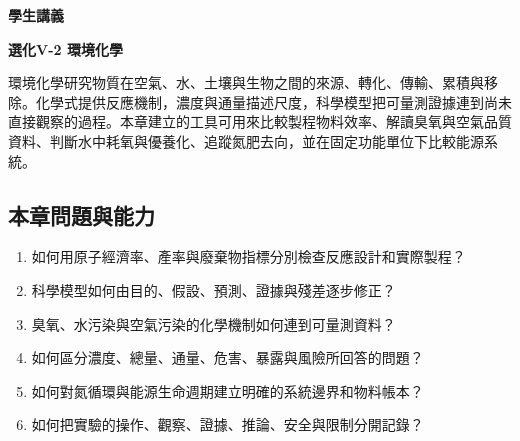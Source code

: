 \documentclass[11pt,a4paper]{article}
\providecommand{\tightlist}{%
  \setlength{\itemsep}{0pt}\setlength{\parskip}{0pt}}
\begin{document}
\begin{tcolorbox}[
  enhanced,colback=white,colframe=HandoutBlue,boxrule=1.1pt,arc=2mm,
  borderline west={3pt}{0pt}{HandoutBlue},left=5mm,right=4mm,top=4mm,bottom=4mm
]
{\sffamily\small\bfseries\color{HandoutBlue}學生講義}\par
{\sffamily\bfseries\LARGE\color{HandoutInk}選化V-2 環境化學}\par
\vspace{0.35em}{\large 以物料守恆、反應機制與資料尺度，分析污染、資源與能源系統}\par
{}\par
{}\par
\end{tcolorbox}


環境化學研究物質在空氣、水、土壤與生物之間的來源、轉化、傳輸、累積與移除。化學式提供反應機制，濃度與通量描述尺度，科學模型把可量測證據連到尚未直接觀察的過程。本章建立的工具可用來比較製程物料效率、解讀臭氧與空氣品質資料、判斷水中耗氧與優養化、追蹤氮肥去向，並在固定功能單位下比較能源系統。

\begin{HandoutLearningMap}

\subsection{本章問題與能力}\label{ux672cux7ae0ux554fux984cux8207ux80fdux529b}

\begin{enumerate}
\def\labelenumi{\arabic{enumi}.}
\tightlist
\item
  如何用原子經濟率、產率與廢棄物指標分別檢查反應設計和實際製程？
\item
  科學模型如何由目的、假設、預測、證據與殘差逐步修正？
\item
  臭氧、水污染與空氣污染的化學機制如何連到可量測資料？
\item
  如何區分濃度、總量、通量、危害、暴露與風險所回答的問題？
\item
  如何對氮循環與能源生命週期建立明確的系統邊界和物料帳本？
\item
  如何把實驗的操作、觀察、證據、推論、安全與限制分開記錄？
\end{enumerate}

\end{HandoutLearningMap}
\end{document}
